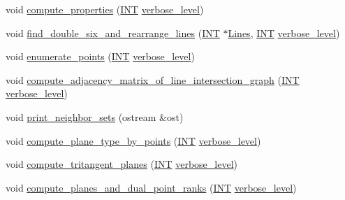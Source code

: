 \begin{DoxyCompactItemize}
\item 
void \mbox{\hyperlink{classsurface__object_ad6c02c3c1432f8adfe49932041ce1b20}{compute\+\_\+properties}} (\mbox{\hyperlink{galois_8h_a09fddde158a3a20bd2dcadb609de11dc}{I\+NT}} \mbox{\hyperlink{simeon_8_c_a818073fbcc2f439e7c56952f67386122}{verbose\+\_\+level}})
\item 
void \mbox{\hyperlink{classsurface__object_aa2fc4ff039e9f3a5ac29718e29b6b90c}{find\+\_\+double\+\_\+six\+\_\+and\+\_\+rearrange\+\_\+lines}} (\mbox{\hyperlink{galois_8h_a09fddde158a3a20bd2dcadb609de11dc}{I\+NT}} $\ast$\mbox{\hyperlink{classsurface__object_a0fae2a45446843f691e91d58fb905afe}{Lines}}, \mbox{\hyperlink{galois_8h_a09fddde158a3a20bd2dcadb609de11dc}{I\+NT}} \mbox{\hyperlink{simeon_8_c_a818073fbcc2f439e7c56952f67386122}{verbose\+\_\+level}})
\item 
void \mbox{\hyperlink{classsurface__object_a001a13b6ea34dbe559033af634203466}{enumerate\+\_\+points}} (\mbox{\hyperlink{galois_8h_a09fddde158a3a20bd2dcadb609de11dc}{I\+NT}} \mbox{\hyperlink{simeon_8_c_a818073fbcc2f439e7c56952f67386122}{verbose\+\_\+level}})
\item 
void \mbox{\hyperlink{classsurface__object_aeef0d278d1d82c7af525add5ae85d713}{compute\+\_\+adjacency\+\_\+matrix\+\_\+of\+\_\+line\+\_\+intersection\+\_\+graph}} (\mbox{\hyperlink{galois_8h_a09fddde158a3a20bd2dcadb609de11dc}{I\+NT}} \mbox{\hyperlink{simeon_8_c_a818073fbcc2f439e7c56952f67386122}{verbose\+\_\+level}})
\item 
void \mbox{\hyperlink{classsurface__object_abe0201b117e124fccff446f61b0faa47}{print\+\_\+neighbor\+\_\+sets}} (ostream \&ost)
\item 
void \mbox{\hyperlink{classsurface__object_a7ad585c88d5c8278850d5f4c9281798c}{compute\+\_\+plane\+\_\+type\+\_\+by\+\_\+points}} (\mbox{\hyperlink{galois_8h_a09fddde158a3a20bd2dcadb609de11dc}{I\+NT}} \mbox{\hyperlink{simeon_8_c_a818073fbcc2f439e7c56952f67386122}{verbose\+\_\+level}})
\item 
void \mbox{\hyperlink{classsurface__object_ae6d924af993146400e0e484e41def0ab}{compute\+\_\+tritangent\+\_\+planes}} (\mbox{\hyperlink{galois_8h_a09fddde158a3a20bd2dcadb609de11dc}{I\+NT}} \mbox{\hyperlink{simeon_8_c_a818073fbcc2f439e7c56952f67386122}{verbose\+\_\+level}})
\item 
void \mbox{\hyperlink{classsurface__object_a76f0933eada8322819007fb8670db6ee}{compute\+\_\+planes\+\_\+and\+\_\+dual\+\_\+point\+\_\+ranks}} (\mbox{\hyperlink{galois_8h_a09fddde158a3a20bd2dcadb609de11dc}{I\+NT}} \mbox{\hyperlink{simeon_8_c_a818073fbcc2f439e7c56952f67386122}{verbose\+\_\+level}})

\end{DoxyCompactItemize}
